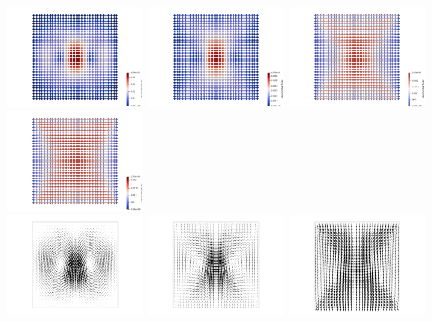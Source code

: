 \noindent
\includegraphics[width=4cm]{python_codes/fieldstone_77/results/block/velA}
\includegraphics[width=4cm]{python_codes/fieldstone_77/results/block/velB}
\includegraphics[width=4cm]{python_codes/fieldstone_77/results/block/velC}
\includegraphics[width=4cm]{python_codes/fieldstone_77/results/block/velD}\\
\includegraphics[width=4cm]{python_codes/fieldstone_77/results/block/velAv}
\includegraphics[width=4cm]{python_codes/fieldstone_77/results/block/velBv}
\includegraphics[width=4cm]{python_codes/fieldstone_77/results/block/velCv}
